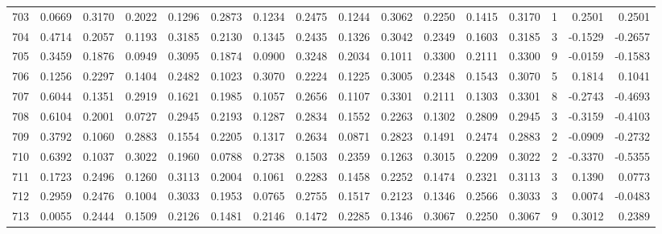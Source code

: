 \begin{tabular}{lrrrrrrrrrrrrrrr}
703 &      0.0669 &  0.3170 &  0.2022 &  0.1296 &  0.2873 &  0.1234 &  0.2475 &  0.1244 &  0.3062 &  0.2250 &   0.1415 &     0.3170 &      1 &                    0.2501 &                     0.2501 \\
704 &      0.4714 &  0.2057 &  0.1193 &  0.3185 &  0.2130 &  0.1345 &  0.2435 &  0.1326 &  0.3042 &  0.2349 &   0.1603 &     0.3185 &      3 &                   -0.1529 &                    -0.2657 \\
705 &      0.3459 &  0.1876 &  0.0949 &  0.3095 &  0.1874 &  0.0900 &  0.3248 &  0.2034 &  0.1011 &  0.3300 &   0.2111 &     0.3300 &      9 &                   -0.0159 &                    -0.1583 \\
706 &      0.1256 &  0.2297 &  0.1404 &  0.2482 &  0.1023 &  0.3070 &  0.2224 &  0.1225 &  0.3005 &  0.2348 &   0.1543 &     0.3070 &      5 &                    0.1814 &                     0.1041 \\
707 &      0.6044 &  0.1351 &  0.2919 &  0.1621 &  0.1985 &  0.1057 &  0.2656 &  0.1107 &  0.3301 &  0.2111 &   0.1303 &     0.3301 &      8 &                   -0.2743 &                    -0.4693 \\
708 &      0.6104 &  0.2001 &  0.0727 &  0.2945 &  0.2193 &  0.1287 &  0.2834 &  0.1552 &  0.2263 &  0.1302 &   0.2809 &     0.2945 &      3 &                   -0.3159 &                    -0.4103 \\
709 &      0.3792 &  0.1060 &  0.2883 &  0.1554 &  0.2205 &  0.1317 &  0.2634 &  0.0871 &  0.2823 &  0.1491 &   0.2474 &     0.2883 &      2 &                   -0.0909 &                    -0.2732 \\
710 &      0.6392 &  0.1037 &  0.3022 &  0.1960 &  0.0788 &  0.2738 &  0.1503 &  0.2359 &  0.1263 &  0.3015 &   0.2209 &     0.3022 &      2 &                   -0.3370 &                    -0.5355 \\
711 &      0.1723 &  0.2496 &  0.1260 &  0.3113 &  0.2004 &  0.1061 &  0.2283 &  0.1458 &  0.2252 &  0.1474 &   0.2321 &     0.3113 &      3 &                    0.1390 &                     0.0773 \\
712 &      0.2959 &  0.2476 &  0.1004 &  0.3033 &  0.1953 &  0.0765 &  0.2755 &  0.1517 &  0.2123 &  0.1346 &   0.2566 &     0.3033 &      3 &                    0.0074 &                    -0.0483 \\
713 &      0.0055 &  0.2444 &  0.1509 &  0.2126 &  0.1481 &  0.2146 &  0.1472 &  0.2285 &  0.1346 &  0.3067 &   0.2250 &     0.3067 &      9 &                    0.3012 &                     0.2389 \\

\end{tabular}
